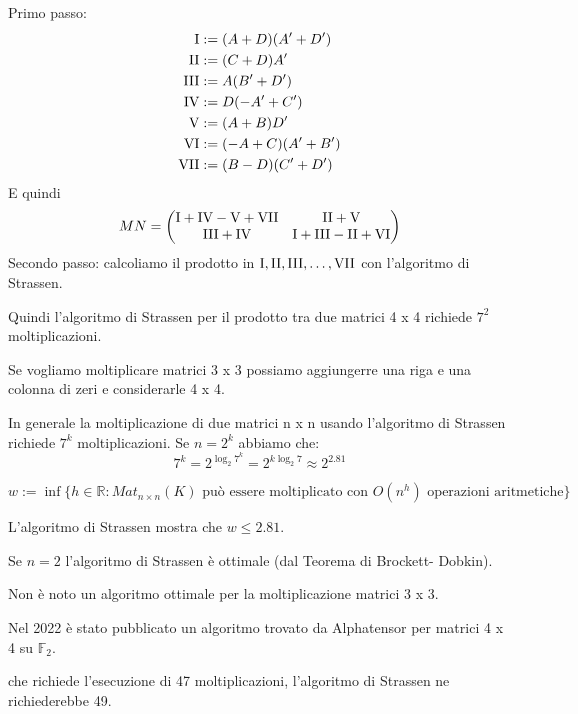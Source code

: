 \documentclass[../main.tex]{subfiles}
\begin{document}
Primo passo:
\begin{align*}
    \RomanNumber 1 & := (A + D)(A' + D')  \\
    \RomanNumber 2 & := (C + D) A'        \\
    \RomanNumber 3 & := A(B' + D')        \\
    \RomanNumber 4 & := D(-A' + C')       \\
    \RomanNumber 5 & := (A + B)D'         \\
    \RomanNumber 6 & := (-A + C)(A' + B') \\
    \RomanNumber 7 & := (B - D)(C' + D')
\end{align*}
E quindi
\begin{equation*}
    MN = \begin{pmatrix}
        \RomanNumber 1 + \RomanNumber 4 - \RomanNumber 5 + \RomanNumber 7 & \RomanNumber 2 + \RomanNumber 5                                   \\
        \RomanNumber 3 + \RomanNumber 4                                   & \RomanNumber 1 + \RomanNumber 3 - \RomanNumber 2 + \RomanNumber 6
    \end{pmatrix}
\end{equation*}
Secondo passo: calcoliamo il prodotto in $\RomanNumber 1, \RomanNumber 2, \RomanNumber 3, \ldots , \RomanNumber 7$ con l'algoritmo di Strassen.

Quindi l'algoritmo di Strassen per il prodotto tra due matrici 4 x 4 richiede $7^2$ moltiplicazioni.

Se vogliamo moltiplicare matrici 3 x 3 possiamo aggiungerre una riga e una colonna di zeri e considerarle 4 x 4.

In generale la moltiplicazione di due matrici n x n usando l'algoritmo di Strassen richiede $7^k$ moltiplicazioni. Se $n = 2^k$ abbiamo che:
\begin{equation*}
    7^k = 2^{\log_2 7^k}=2^{k \log_2 7} \approx 2^{2.81}
\end{equation*}

\begin{definition}
    \begin{equation*}
        w := \inf \{ h \in \mathbb{R} : Mat_{n \times n}(K) \text{ può essere moltiplicato con } O(n^h) \text{ operazioni aritmetiche} \}
    \end{equation*}
\end{definition}

L'algoritmo di Strassen mostra che $w \leq 2.81$.

Se $n = 2$ l'algoritmo di Strassen è ottimale (dal Teorema di Brockett- Dobkin).

Non è noto un algoritmo ottimale per la moltiplicazione matrici 3 x 3.

Nel 2022 è stato pubblicato un algoritmo trovato da Alphatensor per matrici 4 x 4 su $\mathbb{F}_2$.

che richiede l'esecuzione di 47 moltiplicazioni, l'algoritmo di Strassen ne richiederebbe 49.
\end{document}
